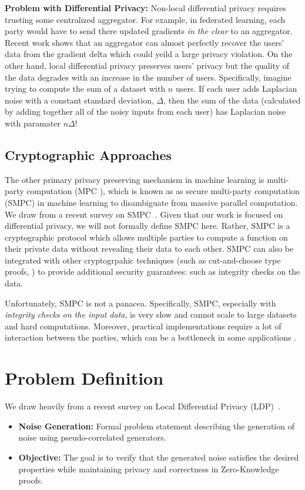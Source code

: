 \documentclass[11pt]{article}
\begin{document}
\textbf{Problem with Differential Privacy:} Non-local differential privacy requires trusting some centralized aggregator.
For example, in federated learning, each party would have to send there updated gradients \emph{in the clear} to an aggregator.
Recent work  shows that an aggregator can almost perfectly recover the users' data from the gradient delta which could yeild a large privacy violation.
On the other hand, local differential privacy preserves users' privacy but the quality of the data degrades with an increase in the number of users.
Specifically, imagine trying to compute the sum of a dataset with $n$ users.
If each user adds Laplacian noise with a constant standard deviation, $\Delta$, then the sum of the data (calculated by adding together all of the noisy inputs from each user) has Laplacian noise with paramater $n \Delta$!

\subsection{Cryptographic Approaches}
The other primary privacy preserving mechanism in machine learning is multi-party computation (MPC ), which is known as as secure multi-party computation (SMPC) in machine learning to disambiguate from massive parallel computation.
We draw from a recent survey on SMPC~\cite{zhou2024secure}.
Given that our work is focused on differential privacy, we will not formally define SMPC here.
Rather, SMPC is a cryptographic protocol which allows multiple parties to compute a function on their private data without revealing their data to each other.
SMPC can also be integrated with other cryptogrpahic techniques (such as cut-and-choose type proofs, ) to provide additional security guarantees: such as integrity checks on the data.

Unfortunately, SMPC is not a panacea.
Specifically, SMPC, especially with \emph{integrity checks on the input data}, is very slow and cannot scale to large datasets and hard computations.
Moreover, practical implementations require a lot of interaction between the parties, which can be a bottleneck in some applications \cite{zhao2019secure}.


\section{Problem Definition}
We draw heavily from a recent survey on Local Differential Privacy (LDP)~\cite{yang2023local}.
\begin{itemize}
    \item \textbf{Noise Generation:} Formal problem statement describing the generation of noise using pseudo-correlated generators.
    \item \textbf{Objective:} The goal is to verify that the generated noise satisfies the desired properties while maintaining privacy and correctness in Zero-Knowledge proofs.
\end{itemize}
\end{document}
